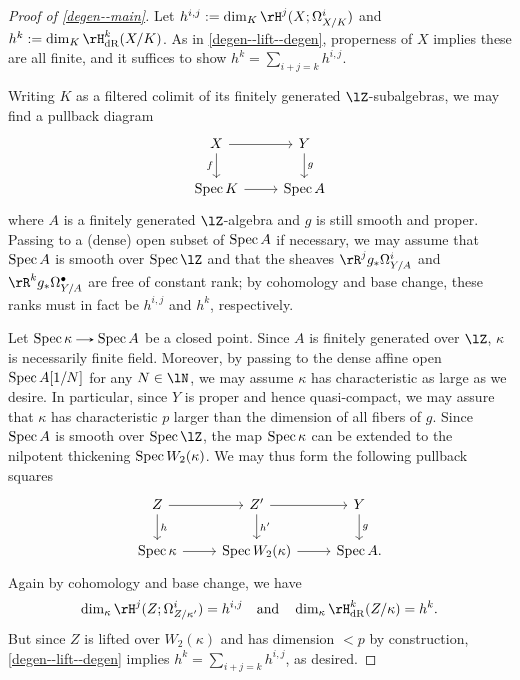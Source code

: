 \begin{proof}[Proof of \cref{degen--main}]
  Let $h^{i,j} \ce \dim_K \rH^j(X;\Omega_{X/K}^i)$ and $h^k \ce \dim_K \rH_\dR^k(X/K)$. As in \cref{degen--lift--degen}, properness of $X$ implies these are all finite, and it suffices to show $h^k = \sum_{i+j=k} h^{i,j}$.

  Writing $K$ as a filtered colimit of its finitely generated $\lZ$-subalgebras, we may find a pullback diagram
  \[
    \begin{tikzcd}
      X \ar[r] \ar[d, "f", swap] &
      Y \ar[d, "g"] \\
      \Spec K \ar[r] &
      \Spec A
    \end{tikzcd}
  \]
  where $A$ is a finitely generated $\lZ$-algebra and $g$ is still smooth and proper. Passing to a (dense) open subset of $\operatorname{Spec} A$ if necessary, we may assume that $\operatorname{Spec} A$ is smooth over $\Spec \lZ$ and that the sheaves $\rR^jg_*\Omega_{Y/A}^i$ and $\rR^kg_*\Omega_{Y/A}^\bullet$ are free of constant rank; by cohomology and base change, these ranks must in fact be $h^{i,j}$ and $h^k$, respectively.

  Let $\Spec \kappa \to \Spec A$ be a closed point. Since $A$ is finitely generated over $\lZ$, $\kappa$ is necessarily finite field. Moreover, by passing to the dense affine open $\operatorname{Spec} A[1/N]$ for any $N \in \lN$, we may assume $\kappa$ has characteristic as large as we desire. In particular, since $Y$ is proper and hence quasi-compact, we may assure that $\kappa$ has characteristic $p$ larger than the dimension of all fibers of $g$. Since $\operatorname{Spec} A$ is smooth over $\Spec \lZ$, the map $\operatorname{Spec} \kappa$ can be extended to the nilpotent thickening $\operatorname{Spec} W_2(\kappa)$. We may thus form the following pullback squares
  \[
    \begin{tikzcd}
      Z \ar[r] \ar[d, "h"] &
      Z' \ar[r] \ar[d, "h'"] &
      Y \ar[d, "g"] \\
      \Spec \kappa \ar[r] &
      \Spec W_2(\kappa) \ar[r] &
      \Spec A.
    \end{tikzcd}
  \]
  Again by cohomology and base change, we have
  \[
    \dim_\kappa \rH^j(Z;\Omega^i_{Z/\kappa'}) = h^{i,j}
    \quad\text{and}\quad
    \dim_\kappa \rH_\dR^k(Z/\kappa) = h^k.
  \]
  But since $Z$ is lifted over $W_2(\kappa)$ and has dimension $< p$ by construction, \cref{degen--lift--degen} implies $h^k = \sum_{i+j=k} h^{i,j}$, as desired.
\end{proof}